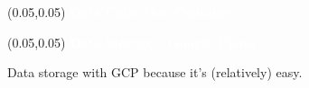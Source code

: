 \documentclass[aspectratio=169]{beamer} %
\begin{document}
\begin{frame}{}
    \setlength{\TPHorizModule}{\textwidth}
    \setlength{\TPVertModule}{\textwidth}
    \begin{textblock}{0.74} (0.05,0.05)
        \bfseries\large\textcolor{white}{Data Collection Container}
    \end{textblock}

\end{frame}

\begin{frame}{}
    \setlength{\TPHorizModule}{\textwidth}
    \setlength{\TPVertModule}{\textwidth}
    \begin{textblock}{0.74}(0.05,0.05)
        \bfseries\large\textcolor{white}{Data Storage - Google Cloud}
    \end{textblock}

Data storage with GCP because it's (relatively) easy.
\end{frame}
\end{document}
